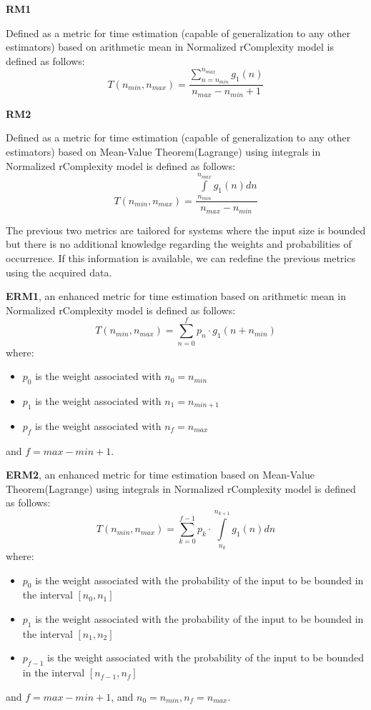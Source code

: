 \begin{definition}
    \textbf{RM1}

    Defined as a metric for time estimation (capable of generalization to any other estimators) based on arithmetic mean in Normalized rComplexity model is defined as follows:
    \[  T(n_{min}, n_{max}) = \dfrac{\sum\limits_{n=n_{min}}^{n_{max}} g_{1}(n)}{n_{max} - n_{min} + 1}  \]
\end{definition}

\begin{definition}
    \textbf{RM2}

    Defined as a metric for time estimation (capable of generalization to any other estimators) based on Mean-Value Theorem(Lagrange) using integrals in Normalized rComplexity model is defined as follows:
    \[  T(n_{min}, n_{max}) = \dfrac{\int\limits_{n_{min}}^{n_{max}} g_{1}(n) dn}{n_{max} - n_{min}}  \]
\end{definition}

The previous two metrics are tailored for systems where the input size is bounded but there is no additional knowledge regarding the weights and probabilities of occurrence. If this information is available, we can redefine the previous metrics using the acquired data.

\begin{definition}
    \textbf{ERM1}, an enhanced metric for time estimation based on arithmetic mean in Normalized rComplexity model is defined as follows:
    \[  T(n_{min}, n_{max}) = \sum\limits_{n=0}^{f} p_{n} \cdot g_{1}(n + n_{min})  \]
    where:
    \begin{itemize}
        \item $p_{0}$ is the weight associated with $n_{0} = n_{min}$
        \item $p_{1}$ is the weight associated with $n_{1} = n_{min + 1}$
        \item $p_{f}$ is the weight associated with $n_{f} = n_{max}$
    \end{itemize}
    and $f = max - min + 1$.
\end{definition}

\begin{definition}
    \textbf{ERM2}, an enhanced metric for time estimation based on Mean-Value Theorem(Lagrange) using integrals in Normalized rComplexity model is defined as follows:
    \[  T(n_{min}, n_{max}) =\sum\limits_{k=0}^{f-1} p_{k} \cdot \int\limits_{n_{k}}^{n_{k+1}} g_{1}(n) dn  \]
    where:
    \begin{itemize}
        \item $p_{0}$ is the weight associated with the probability of the input to be bounded in the interval $[n_{0}, n_{1}]$
        \item $p_{1}$ is the weight associated with the probability of the input to be bounded in the interval $[n_{1}, n_{2}]$
        \item $p_{f-1}$ is the weight associated with the probability of the input to be bounded in the interval $[n_{f-1}, n_{f}]$
    \end{itemize}
    and $f = max - min + 1$, and $n_{0} = n_{min}, n_{f} = n_{max}$.
\end{definition}


